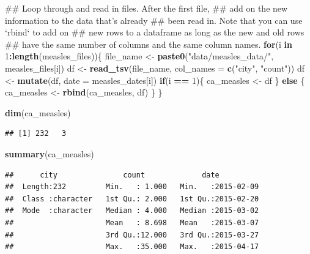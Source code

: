 \documentclass[]{book}
\makeatletter
\newenvironment{Shaded}{\begin{snugshade}}{\end{snugshade}}
\newcommand{\KeywordTok}[1]{\textcolor[rgb]{0.13,0.29,0.53}{\textbf{#1}}}
\newcommand{\DataTypeTok}[1]{\textcolor[rgb]{0.13,0.29,0.53}{#1}}
\newcommand{\DecValTok}[1]{\textcolor[rgb]{0.00,0.00,0.81}{#1}}
\newcommand{\StringTok}[1]{\textcolor[rgb]{0.31,0.60,0.02}{#1}}
\newcommand{\ControlFlowTok}[1]{\textcolor[rgb]{0.13,0.29,0.53}{\textbf{#1}}}
\newcommand{\OperatorTok}[1]{\textcolor[rgb]{0.81,0.36,0.00}{\textbf{#1}}}
\newcommand{\NormalTok}[1]{#1}
\newenvironment{kframe}{%
\medskip{}
\setlength{\fboxsep}{.8em}
 \def\at@end@of@kframe{}%
 \ifinner\ifhmode%
  \def\at@end@of@kframe{\end{minipage}}%
  \begin{minipage}{\columnwidth}%
 \fi\fi%
 \def\FrameCommand##1{\hskip\@totalleftmargin \hskip-\fboxsep
 \colorbox{shadecolor}{##1}\hskip-\fboxsep
     \hskip-\linewidth \hskip-\@totalleftmargin \hskip\columnwidth}%
 \MakeFramed {\advance\hsize-\width
   \@totalleftmargin\z@ \linewidth\hsize
   \@setminipage}}%
 {\par\unskip\endMakeFramed%
 \at@end@of@kframe}
\renewenvironment{Shaded}{\begin{kframe}}{\end{kframe}}
\theoremstyle{definition}
\theoremstyle{definition}
\theoremstyle{definition}
\theoremstyle{remark}
\makeatother
\begin{document}
\begin{Shaded}
\begin{Highlighting}[]
\NormalTok{## Loop through and read in files. After the first file,}
\NormalTok{## add on the new information to the data that's already }
\NormalTok{## been read in. Note that you can use `rbind` to add on }
\NormalTok{## new rows to a dataframe as long as the new and old rows}
\NormalTok{## have the same number of columns and the same column names.}
\ControlFlowTok{for}\NormalTok{(i }\ControlFlowTok{in} \DecValTok{1}\OperatorTok{:}\KeywordTok{length}\NormalTok{(measles_files))\{}
\NormalTok{        file_name <-}\StringTok{ }\KeywordTok{paste0}\NormalTok{(}\StringTok{"data/measles_data/"}\NormalTok{, measles_files[i])}
\NormalTok{        df <-}\StringTok{ }\KeywordTok{read_tsv}\NormalTok{(file_name, }\DataTypeTok{col_names =} \KeywordTok{c}\NormalTok{(}\StringTok{"city"}\NormalTok{, }\StringTok{"count"}\NormalTok{))}
\NormalTok{        df <-}\StringTok{ }\KeywordTok{mutate}\NormalTok{(df, }\DataTypeTok{date =}\NormalTok{ measles_dates[i])}
        \ControlFlowTok{if}\NormalTok{(i }\OperatorTok{==}\StringTok{ }\DecValTok{1}\NormalTok{)\{}
\NormalTok{                ca_measles <-}\StringTok{ }\NormalTok{df}
\NormalTok{        \} }\ControlFlowTok{else}\NormalTok{ \{ }
\NormalTok{                 ca_measles <-}\StringTok{ }\KeywordTok{rbind}\NormalTok{(ca_measles, df)}
\NormalTok{                \}}
\NormalTok{\}}

\KeywordTok{dim}\NormalTok{(ca_measles)}
\end{Highlighting}
\end{Shaded}

\begin{verbatim}
## [1] 232   3
\end{verbatim}

\begin{Shaded}
\begin{Highlighting}[]
\KeywordTok{summary}\NormalTok{(ca_measles)}
\end{Highlighting}
\end{Shaded}

\begin{verbatim}
##      city               count             date           
##  Length:232         Min.   : 1.000   Min.   :2015-02-09  
##  Class :character   1st Qu.: 2.000   1st Qu.:2015-02-20  
##  Mode  :character   Median : 4.000   Median :2015-03-02  
##                     Mean   : 8.698   Mean   :2015-03-07  
##                     3rd Qu.:12.000   3rd Qu.:2015-03-27  
##                     Max.   :35.000   Max.   :2015-04-17
\end{verbatim}
\end{document}
